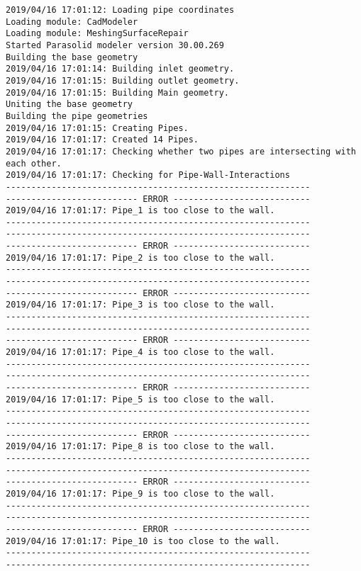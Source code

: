\documentclass{article}
\begin{document}
{\tiny 
\begin{verbatim}
2019/04/16 17:01:12: Loading pipe coordinates
Loading module: CadModeler
Loading module: MeshingSurfaceRepair
Started Parasolid modeler version 30.00.269
Building the base geometry
2019/04/16 17:01:14: Building inlet geometry.
2019/04/16 17:01:15: Building outlet geometry.
2019/04/16 17:01:15: Building Main geometry.
Uniting the base geometry
Building the pipe geometries
2019/04/16 17:01:15: Creating Pipes.
2019/04/16 17:01:17: Created 14 Pipes.
2019/04/16 17:01:17: Checking whether two pipes are intersecting with each other.
2019/04/16 17:01:17: Checking for Pipe-Wall-Interactions
------------------------------------------------------------
-------------------------- ERROR ---------------------------
2019/04/16 17:01:17: Pipe_1 is too close to the wall.
------------------------------------------------------------
------------------------------------------------------------
-------------------------- ERROR ---------------------------
2019/04/16 17:01:17: Pipe_2 is too close to the wall.
------------------------------------------------------------
------------------------------------------------------------
-------------------------- ERROR ---------------------------
2019/04/16 17:01:17: Pipe_3 is too close to the wall.
------------------------------------------------------------
------------------------------------------------------------
-------------------------- ERROR ---------------------------
2019/04/16 17:01:17: Pipe_4 is too close to the wall.
------------------------------------------------------------
------------------------------------------------------------
-------------------------- ERROR ---------------------------
2019/04/16 17:01:17: Pipe_5 is too close to the wall.
------------------------------------------------------------
------------------------------------------------------------
-------------------------- ERROR ---------------------------
2019/04/16 17:01:17: Pipe_8 is too close to the wall.
------------------------------------------------------------
------------------------------------------------------------
-------------------------- ERROR ---------------------------
2019/04/16 17:01:17: Pipe_9 is too close to the wall.
------------------------------------------------------------
------------------------------------------------------------
-------------------------- ERROR ---------------------------
2019/04/16 17:01:17: Pipe_10 is too close to the wall.
------------------------------------------------------------
------------------------------------------------------------

\end{verbatim}}
\end{document}
